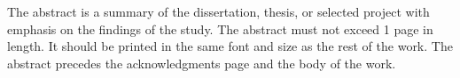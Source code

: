 \afterpage{\cleardoublepage}
The abstract is a summary of the dissertation, thesis, or selected project with emphasis on the findings of the study.  The abstract must not exceed 1 page in length.  It should be printed in the same font and size as the rest of the work.  The abstract precedes the acknowledgments page and the body of the work.
